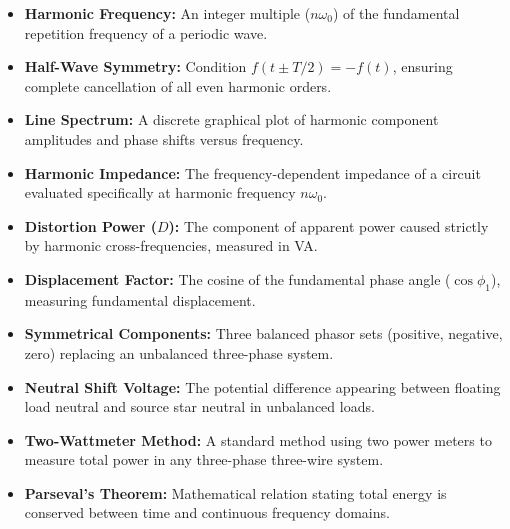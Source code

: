 \documentclass[12pt,a4paper]{article}
\begin{document}
\begin{tcolorbox}[defbox, title={\textbf{One-Line Definitions}}]
\begin{itemize}[leftmargin=*, itemsep=2pt, topsep=0pt]
  \item \textbf{Harmonic Frequency:} An integer multiple ($n\omega_0$) of the fundamental repetition frequency of a periodic wave.
  \item \textbf{Half-Wave Symmetry:} Condition $f(t \pm T/2) = -f(t)$, ensuring complete cancellation of all even harmonic orders.
  \item \textbf{Line Spectrum:} A discrete graphical plot of harmonic component amplitudes and phase shifts versus frequency.
  \item \textbf{Harmonic Impedance:} The frequency-dependent impedance of a circuit evaluated specifically at harmonic frequency $n\omega_0$.
  \item \textbf{Distortion Power ($D$):} The component of apparent power caused strictly by harmonic cross-frequencies, measured in VA.
  \item \textbf{Displacement Factor:} The cosine of the fundamental phase angle ($\cos\phi_1$), measuring fundamental displacement.
  \item \textbf{Symmetrical Components:} Three balanced phasor sets (positive, negative, zero) replacing an unbalanced three-phase system.
  \item \textbf{Neutral Shift Voltage:} The potential difference appearing between floating load neutral and source star neutral in unbalanced loads.
  \item \textbf{Two-Wattmeter Method:} A standard method using two power meters to measure total power in any three-phase three-wire system.
  \item \textbf{Parseval's Theorem:} Mathematical relation stating total energy is conserved between time and continuous frequency domains.
\end{itemize}
\end{tcolorbox}
\end{document}
